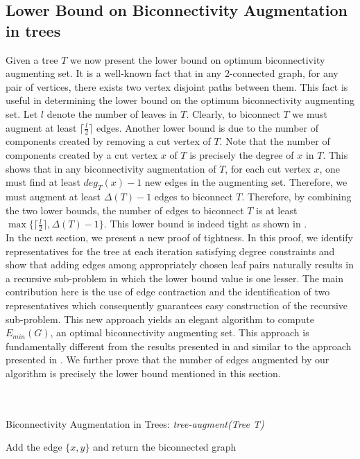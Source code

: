 \documentclass[runningheads]{llncs}
\begin{document}
\subsection{Lower Bound on Biconnectivity Augmentation in trees}
Given a tree $T$ we now present the lower bound on optimum biconnectivity augmenting set.  It is a well-known fact that in any 2-connected graph, for any pair of vertices, there exists two vertex disjoint paths between them.  This fact is useful in determining the lower bound on the optimum biconnectivity augmenting set.  Let $l$ denote the number of leaves in $T$.  Clearly, to biconnect $T$ we must augment at least $\lceil \frac{l}{2} \rceil$ edges.  Another lower bound is due to the number of components created by removing a cut vertex of $T$.  Note that the number of components created by a cut vertex $x$ of $T$ is precisely the degree of $x$ in $T$.   This shows that in any biconnectivity augmentation of $T$, for each cut vertex $x$, one must find at least $deg_T(x)-1$ new edges in the augmenting set.  Therefore, we must augment at least $\Delta(T)-1$ edges to biconnect $T$.  Therefore, by combining the two lower bounds, the number of edges to biconnect $T$ is at least $\max\{\lceil \frac{l}{2} \rceil, \Delta(T)-1\}$.  This lower bound is indeed tight as shown in \cite{tarjan}.  \\
In the next section, we present a new proof of tightness.  In this proof, we identify representatives for the tree at each iteration satisfying degree constraints and show that adding edges among appropriately chosen leaf pairs naturally results in a recursive sub-problem in which the lower bound value is one lesser.   The main contribution here is the use of edge contraction and the identification of two representatives which consequently guarantees easy construction of the recursive sub-problem.  This new approach yields an elegant algorithm  to compute $E_{min}(G)$, an optimal biconnectivity augmenting set.  This approach is fundamentally different from the results presented in \cite{tarjan,hsu} and similar to the approach presented in \cite{nsn}.   We further prove that the number of edges augmented by our algorithm is precisely the lower bound mentioned in this section.   \\ \\ \\
\begin{algorithm}[h]
\caption{Biconnectivity Augmentation in Trees: {\em tree-augment(Tree T)}} \label{tree-alg1}
\begin{algorithmic}
\STATE Add the edge $\{x,y\}$ and return the biconnected graph
\ELSE{}
\ELSE{}
\ENDIF
\ENDIF
\end{algorithmic}
\end{algorithm}
\end{document}
